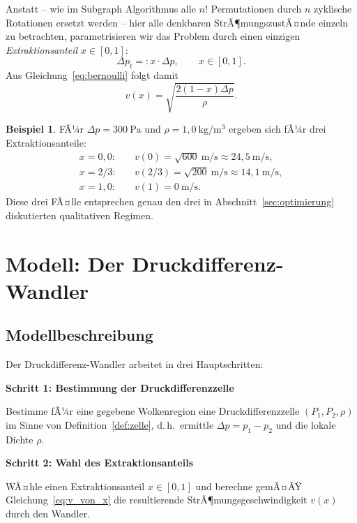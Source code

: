 ﻿\documentclass[a4paper,12pt]{article}
\theoremstyle{definition}
\newtheorem{beispiel}{Beispiel}
\begin{document}
Anstatt -- wie im Subgraph Algorithmus alle $n!$ Permutationen durch $n$
zyklische Rotationen ersetzt werden -- hier alle denkbaren
StrÃ¶mungszustÃ¤nde einzeln zu betrachten, parametrisieren wir das Problem
durch einen einzigen \emph{Extraktionsanteil} $x \in [0,1]$:
\[
	\Delta p_t =: x \cdot \Delta p, \qquad x \in [0,1].
\]
Aus Gleichung~\eqref{eq:bernoulli} folgt damit
\begin{equation}
	\label{eq:v_von_x}
	v(x) = \sqrt{\frac{2(1-x)\Delta p}{\rho}}.
\end{equation}

\begin{beispiel}
	\label{bsp:rotation}
	FÃ¼r $\Delta p = 300\ \mathrm{Pa}$ und $\rho = 1{,}0\ \mathrm{kg/m^3}$
	ergeben sich fÃ¼r drei Extraktionsanteile:
	\begin{align*}
		x=0{,}0:&\quad v(0) = \sqrt{600}\ \mathrm{m/s} \approx 24{,}5\ \mathrm{m/s}, \\
		x=2/3:&\quad v(2/3) = \sqrt{200}\ \mathrm{m/s} \approx 14{,}1\ \mathrm{m/s}, \\
		x=1{,}0:&\quad v(1) = 0\ \mathrm{m/s}.
	\end{align*}
	Diese drei FÃ¤lle entsprechen genau den drei in
	Abschnitt~\ref{sec:optimierung} diskutierten qualitativen Regimen.
\end{beispiel}

\section{Modell: Der Druckdifferenz-Wandler}

\subsection{Modellbeschreibung}

Der Druckdifferenz-Wandler arbeitet in drei Hauptschritten:

\textbf{Schritt 1: Bestimmung der Druckdifferenzzelle}

Bestimme fÃ¼r eine gegebene Wolkenregion eine Druckdifferenzzelle
$(P_1, P_2, \rho)$ im Sinne von Definition~\ref{def:zelle}, d.\,h.\
ermittle $\Delta p = p_1 - p_2$ und die lokale Dichte $\rho$.

\textbf{Schritt 2: Wahl des Extraktionsanteils}

WÃ¤hle einen Extraktionsanteil $x \in [0,1]$ und berechne gemÃ¤ÃŸ
Gleichung~\eqref{eq:v_von_x} die resultierende StrÃ¶mungsgeschwindigkeit
$v(x)$ durch den Wandler.
\end{document}
